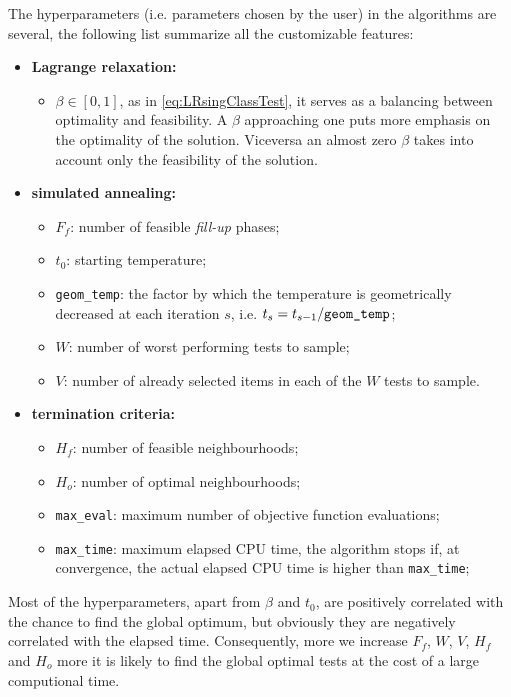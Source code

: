The hyperparameters (i.e. parameters chosen by the user) in the algorithms are several, the following list summarize all the customizable features:
\begin{itemize}
	\item \textbf{Lagrange relaxation:} 
	\begin{itemize}
		\item $\beta \in  [0,1]$, as in \eqref{eq:LRsingClassTest}, it serves as a balancing between optimality and feasibility. A $\beta$ approaching one puts more emphasis on the optimality of the solution. Viceversa an almost zero $\beta$ takes into account only the feasibility of the solution.
	\end{itemize}
	\item \textbf{simulated annealing:}\begin{itemize}
		\item $F_f$: number of feasible \emph{fill-up} phases;
		\item $t_0$: starting temperature;
		\item \texttt{geom\_temp}: the factor by which the temperature is geometrically decreased at each iteration $s$, i.e. $t_s=t_{s-1}/\text{\texttt{geom\_temp}}$;
		\item $W$: number of worst performing tests to sample;
		\item $V$: number of already selected items in each of the $W$ tests to sample.
	\end{itemize}
	\item \textbf{termination criteria:} \begin{itemize}
		\item $H_f$: number of feasible neighbourhoods;
		\item $H_o$: number of optimal neighbourhoods;
		\item \texttt{max\_eval}: maximum number of objective function evaluations;
		\item \texttt{max\_time}: maximum elapsed CPU time, the algorithm stops if, at convergence, the actual elapsed CPU time is higher than \texttt{max\_time};
	\end{itemize}
\end{itemize}
Most of the hyperparameters, apart from $\beta$ and $t_0$, are positively correlated with the chance to find the global optimum, but obviously they are negatively correlated with the elapsed time. Consequently, more we increase  $F_f$, $W$, $V$, $H_f$ and $H_o$ more it is likely to find the global optimal tests at the cost of a large computional time.

